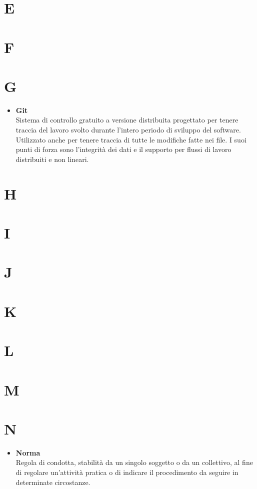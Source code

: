\chapter{E}
\chapter{F}
\chapter{G}
	\begin{itemize}
		\item \textbf{Git}\\
		Sistema di controllo gratuito a versione distribuita progettato per tenere traccia del lavoro svolto durante l'intero periodo di sviluppo del software.
		Utilizzato anche per tenere traccia di tutte le modifiche fatte nei file.
		I suoi punti di forza sono l'integrità dei dati e il supporto per flussi di lavoro distribuiti e non lineari.
	\end{itemize}
\chapter{H}
\chapter{I}
\chapter{J}
\chapter{K}
\chapter{L}
\chapter{M}
\chapter{N}
	\begin{itemize}
		\item \textbf{Norma}\\
		Regola di condotta, stabilità da un singolo soggetto o da un collettivo, al fine di regolare un'attività pratica o di indicare il procedimento da seguire in determinate circostanze.
	\end{itemize}
